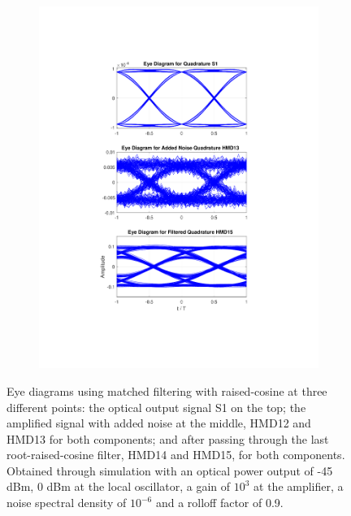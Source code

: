 \begin{figure}[H]
\begin{subfigure}{.45\textwidth}
		\includegraphics[clip, trim=5cm 4cm 5cm 4cm, width=\textwidth]{./sdf/m_qam_system/figures/eyes/q_n_p_45_09_rc.pdf}
	\end{subfigure}
	
	\caption{Eye diagrams using matched filtering with raised-cosine at
		three different points: the optical output signal S1 on the top; the amplified
		signal with added noise at the middle, HMD12 and HMD13 for both components; and
		after passing through the last root-raised-cosine filter, HMD14 and HMD15, for
		both components. Obtained through simulation with an optical power output of
		-45 dBm, 0 dBm at the local oscillator, a gain of $10^3$ at the amplifier, a
		noise spectral density of $10^{-6}$ and a rolloff factor of
		0.9.\label{fig:eyes_n_rc_45_09}}
\end{figure}

